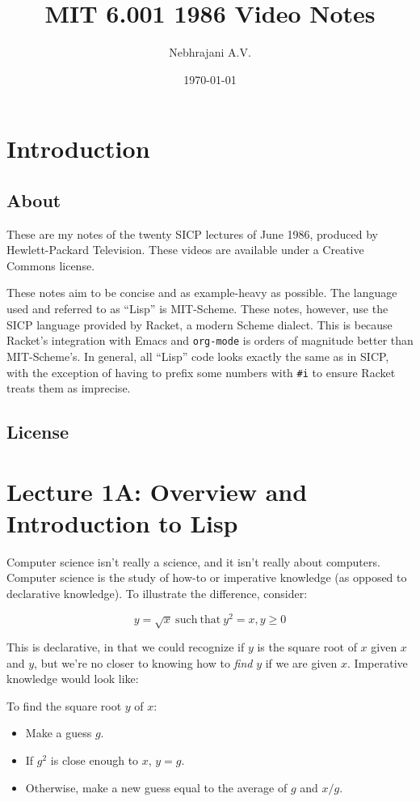 \documentclass[9pt]{report}
\author{Nebhrajani A.V.}
\date{\today}
\title{MIT 6.001 1986 Video Notes}
\begin{document}
\maketitle
\tableofcontents


\chapter{Introduction}
\label{sec:orgeb8590c}

\section{About}
\label{sec:orgeafa133}
These are my notes of the twenty SICP lectures of June 1986,
produced by Hewlett-Packard Television. These videos are available
under a Creative Commons license.

These notes aim to be concise and as example-heavy as possible. The
language used and referred to as ``Lisp'' is MIT-Scheme. These notes,
however, use the SICP language provided by Racket, a modern Scheme
dialect. This is because Racket's integration with Emacs and
\texttt{org-mode} is orders of magnitude better than MIT-Scheme's. In
general, all ``Lisp'' code looks exactly the same as in SICP, with the
exception of having to prefix some numbers with \texttt{\#i} to ensure
Racket treats them as imprecise.

\section{License}
\label{sec:org2ca879d}
\doclicenseThis

\chapter{Lecture 1A: Overview and Introduction to Lisp}
\label{sec:org2023f7c}

Computer science isn't really a science, and it isn't really about
computers. Computer science is the study of how-to or imperative
knowledge (as opposed to declarative knowledge). To illustrate the
difference, consider:

$$y = \sqrt{x} \mathrm{~such~that~} y^2=x, y \geq 0$$

This is declarative, in that we could recognize if \(y\) is the square
root of \(x\) given \(x\) and \(y\), but we're no closer to knowing how to
\emph{find} \(y\) if we are given \(x\). Imperative knowledge would look
like:

To find the square root \(y\) of \(x\):
\begin{itemize}
\item Make a guess \(g\).
\item If \(g^2\) is close enough to \(x\), \(y=g\).
\item Otherwise, make a new guess equal to the average of \(g\) and \(x/g\).
\end{itemize}
\end{document}
